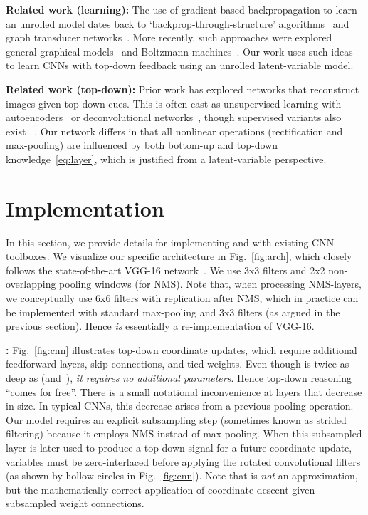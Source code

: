 \documentclass[10pt,twocolumn,letterpaper]{article}
\newcommand{\QP}[1]{{}}
\begin{document}
{\bf Related work (learning):} The use of gradient-based
backpropagation to learn an unrolled model dates back to
`backprop-through-structure'
algorithms~\cite{goller1996learning,socher2011parsing} and graph
transducer networks~\cite{lecun1998gradient}. More recently, such
approaches were explored general graphical
models~\cite{stoyanov2011empirical} and Boltzmann
machines~\cite{goodfellow2013multi}. Our work uses such ideas to learn
CNNs with top-down feedback using an unrolled latent-variable
model.

{\bf Related work (top-down):} Prior work has explored networks that
reconstruct images given top-down cues. This is often cast as
unsupervised learning with
autoencoders~\cite{hinton2006reducing,vincent2010stacked,masci2011stacked}
or deconvolutional networks~\cite{zeiler2010deconvolutional}, though
supervised variants also exist
~\cite{long2014fully,noh2015learning}. Our network differs in that all
nonlinear operations (rectification and max-pooling) are influenced by
both bottom-up and top-down knowledge~\eqref{eq:layer}, which is
justified from a latent-variable perspective.

\section{Implementation}
\label{sec:imp}
In this section, we provide details for implementing \QP{1} and
\QP{2} with existing CNN toolboxes. We visualize our specific
architecture in Fig.~\ref{fig:arch}, which closely follows the
state-of-the-art VGG-16 network~\cite{simonyan2014very}. We use 3x3
filters and 2x2 non-overlapping pooling windows (for NMS). Note that,
when processing NMS-layers, we conceptually use 6x6 filters with
replication after NMS, which in practice can be implemented with
standard max-pooling and 3x3 filters (as argued in the previous
section). Hence \QP{1} {\em is} essentially a re-implementation of
VGG-16.

{\bf \QP{2}:} Fig.~\ref{fig:cnn} illustrates top-down coordinate
updates, which require additional feedforward layers, skip
connections, and tied weights. Even though \QP{2} is twice as deep
as \QP{1} (and~\cite{simonyan2014very}), {\em it requires no
  additional parameters}. Hence top-down reasoning ``comes for
free''. There is a small notational inconvenience at layers that
decrease in size. In typical CNNs, this decrease arises from a
previous pooling operation. Our model requires an explicit 
subsampling step (sometimes known as strided filtering) because it
employs NMS instead of max-pooling. When this subsampled layer is
later used to produce a top-down signal for a future coordinate
update, variables must be zero-interlaced before applying the
 rotated convolutional filters (as shown by hollow circles
in Fig.~\ref{fig:cnn}). Note that is {\em not} an approximation, but
the mathematically-correct application of coordinate descent given
subsampled weight connections.
\end{document}
